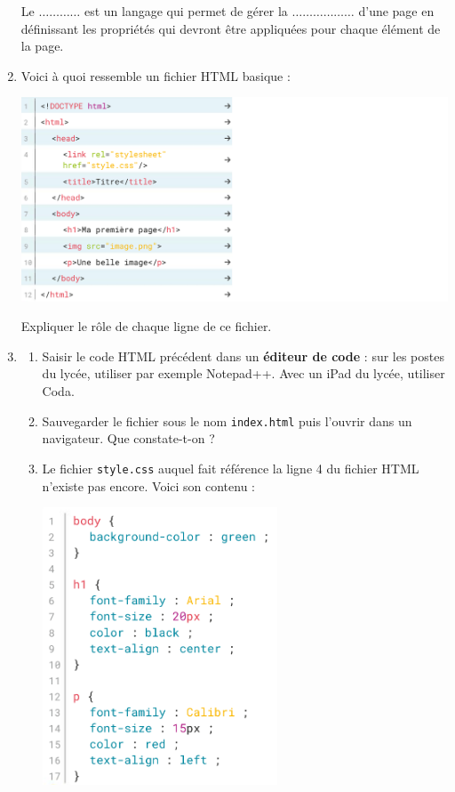 \documentclass[a4paper]{article}
\begin{document}
\begin{enumerate}
    \og{}Le $\hdots\hdots\hdots\hdots$ est un langage qui permet de gérer la $\hdots\hdots\hdots\hdots\hdots\hdots$ d'une page en définissant les propriétés qui devront être appliquées pour chaque élément de la page.\fg{}
  \item Voici à quoi ressemble un fichier HTML basique :
    \begin{center}
      \includegraphics[width=16cm]{page_HTML_de_base.png} 
    \end{center}
    Expliquer le rôle de chaque ligne de ce fichier.
  \item 
    \begin{enumerate}
      \item Saisir le code HTML précédent dans un \textbf{éditeur de code} : sur les postes du lycée, utiliser par exemple Notepad++. Avec un iPad du lycée, utiliser Coda.
      \item Sauvegarder le fichier sous le nom \verb|index.html| puis l'ouvrir dans un navigateur. Que constate-t-on ?
	\pagebreak
      \item Le fichier \verb|style.css| auquel fait référence la ligne 4 du fichier HTML n'existe pas encore. Voici son contenu :
	\begin{center}
	  \includegraphics[width=7cm]{style.css.png}	

\end{center}
\end{enumerate}
\end{enumerate}
\end{document}
